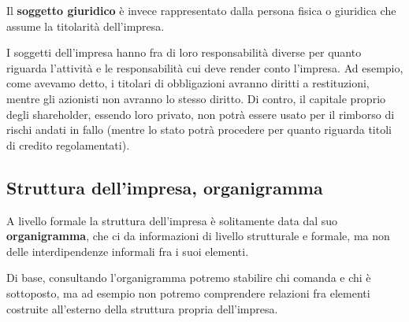 \documentclass[a4paper,11pt]{article}
\begin{document}
Il \textbf{soggetto giuridico} è invece rappresentato dalla persona fisica o giuridica che assume la titolarità dell'impresa.

I soggetti dell'impresa hanno fra di loro responsabilità diverse per quanto riguarda l'attività e le responsabilità cui deve render conto l'impresa.
Ad esempio, come avevamo detto, i titolari di obbligazioni avranno diritti a restituzioni, mentre gli azionisti non avranno lo stesso diritto.
Di contro, il capitale proprio degli shareholder, essendo loro privato, non potrà essere usato per il rimborso di rischi andati in fallo (mentre lo stato potrà procedere per quanto riguarda titoli di credito regolamentati).

\subsection{Struttura dell'impresa, organigramma}
A livello formale la struttura dell'impresa è solitamente data dal suo \textbf{organigramma}, che ci da informazioni di livello strutturale e formale, ma non delle interdipendenze informali fra i suoi elementi.
	
Di base, consultando l'organigramma potremo stabilire chi comanda e chi è sottoposto, ma ad esempio non potremo comprendere relazioni fra elementi costruite all'esterno della struttura propria dell'impresa.
\end{document}

